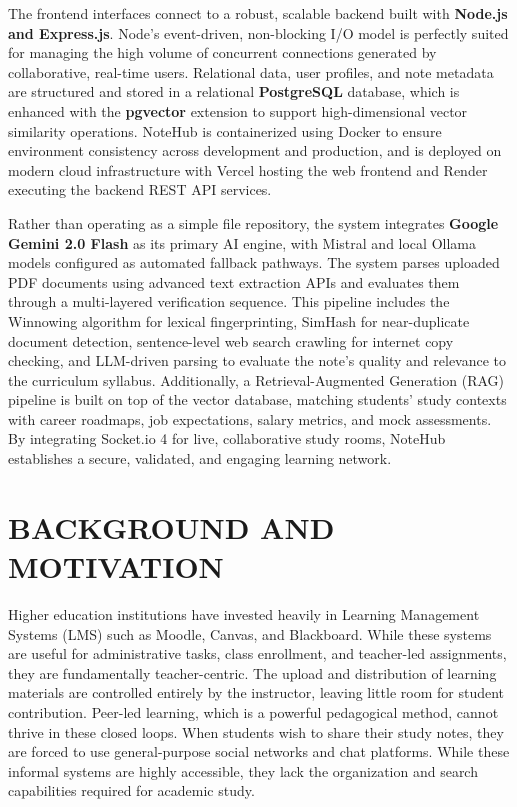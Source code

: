 \documentclass[12,Times new Roman,a4paper]{report}
\begin{document}
The frontend interfaces connect to a robust, scalable backend built with \textbf{Node.js and Express.js}. Node's event-driven, non-blocking I/O model is perfectly suited for managing the high volume of concurrent connections generated by collaborative, real-time users. Relational data, user profiles, and note metadata are structured and stored in a relational \textbf{PostgreSQL} database, which is enhanced with the \textbf{pgvector} extension to support high-dimensional vector similarity operations. NoteHub is containerized using Docker to ensure environment consistency across development and production, and is deployed on modern cloud infrastructure with Vercel hosting the web frontend and Render executing the backend REST API services.

Rather than operating as a simple file repository, the system integrates \textbf{Google Gemini 2.0 Flash} as its primary AI engine, with Mistral and local Ollama models configured as automated fallback pathways. The system parses uploaded PDF documents using advanced text extraction APIs and evaluates them through a multi-layered verification sequence. This pipeline includes the Winnowing algorithm for lexical fingerprinting, SimHash for near-duplicate document detection, sentence-level web search crawling for internet copy checking, and LLM-driven parsing to evaluate the note's quality and relevance to the curriculum syllabus. Additionally, a Retrieval-Augmented Generation (RAG) pipeline is built on top of the vector database, matching students' study contexts with career roadmaps, job expectations, salary metrics, and mock assessments. By integrating Socket.io 4 for live, collaborative study rooms, NoteHub establishes a secure, validated, and engaging learning network.

\section{BACKGROUND AND MOTIVATION}

Higher education institutions have invested heavily in Learning Management Systems (LMS) such as Moodle, Canvas, and Blackboard. While these systems are useful for administrative tasks, class enrollment, and teacher-led assignments, they are fundamentally teacher-centric. The upload and distribution of learning materials are controlled entirely by the instructor, leaving little room for student contribution. Peer-led learning, which is a powerful pedagogical method, cannot thrive in these closed loops. When students wish to share their study notes, they are forced to use general-purpose social networks and chat platforms. While these informal systems are highly accessible, they lack the organization and search capabilities required for academic study.
\end{document}
